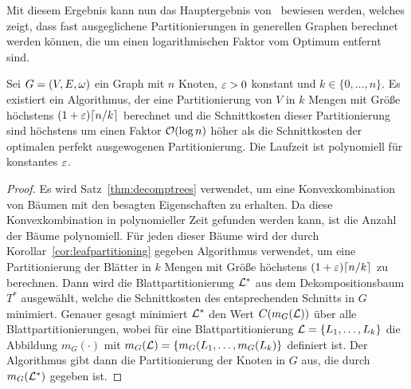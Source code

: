 Mit diesem Ergebnis kann nun das Hauptergebnis von~\parencite{FF15} bewiesen werden, welches zeigt, dass fast ausgeglichene Partitionierungen in generellen Graphen berechnet werden können, die um einen logarithmischen Faktor vom Optimum entfernt sind.

\begin{thm}
    Sei $G = (V, E, \omega)$ ein Graph mit $n$ Knoten, $\varepsilon > 0$ konstant und $k \in \{0, \ldots, n\}$. Es existiert ein Algorithmus, der eine Partitionierung von $V$ in $k$ Mengen mit Größe höchstens $(1 + \eps) \ceil*{n/k}$ berechnet und die Schnittkosten dieser Partitionierung sind höchstens um einen Faktor $\mathcal{O}(\log n)$ höher als die Schnittkosten der optimalen perfekt ausgewogenen Partitionierung.
    Die Laufzeit ist polynomiell für konstantes $\varepsilon$.
\end{thm}
\begin{proof}
    Es wird Satz~\ref{thm:decomptrees} verwendet, um eine Konvexkombination von Bäumen mit den besagten Eigenschaften zu erhalten.
    Da diese Konvexkombination in polynomieller Zeit gefunden werden kann, ist die Anzahl der Bäume polynomiell.
    Für jeden dieser Bäume wird der durch Korollar~\ref{cor:leafpartitioning} gegeben Algorithmus verwendet, um eine Partitionierung der Blätter in $k$ Mengen mit Größe höchstens $(1 + \eps) \ceil*{n/k}$ zu berechnen. Dann wird die Blattpartitionierung $\mathcal{L}^*$ aus dem Dekompositionsbaum $T^*$ ausgewählt, welche die Schnittkosten des entsprechenden Schnitts in $G$ minimiert.
    Genauer gesagt minimiert $\mathcal{L}^*$ den Wert $C(m_G(\mathcal{L}))$ über alle Blattpartitionierungen, wobei für eine Blattpartitionierung $\mathcal{L} = \{L_1, \ldots, L_k\}$ die Abbildung $m_G(\cdot)$ mit $m_G(\mathcal{L}) = \{m_G(L_1, \ldots, m_G(L_k)\}$ definiert ist.
    Der Algorithmus gibt dann die Partitionierung der Knoten in $G$ aus, die durch $m_G(\mathcal{L}^*)$ gegeben ist.


\end{proof}
